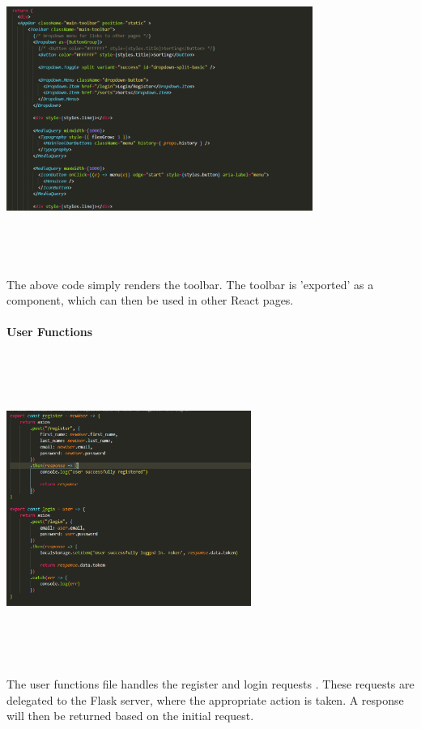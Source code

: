 \begin{center}
    \includegraphics[width=10cm,height=10cm,keepaspectratio]{images/toolbar2}
\end{center}
The above code simply renders the toolbar. The toolbar is 'exported' as a component, which can then be used in other React pages.

\newpage
\paragraph{User Functions}
\begin{center}
    \includegraphics[width=8cm,height=10cm,keepaspectratio]{images/userfuncs}
\end{center}
The user functions file handles the register and login requests \cite{frm_logreg}. These requests are delegated to the Flask server, where the appropriate action is taken. A response will then be returned based on the initial request.

